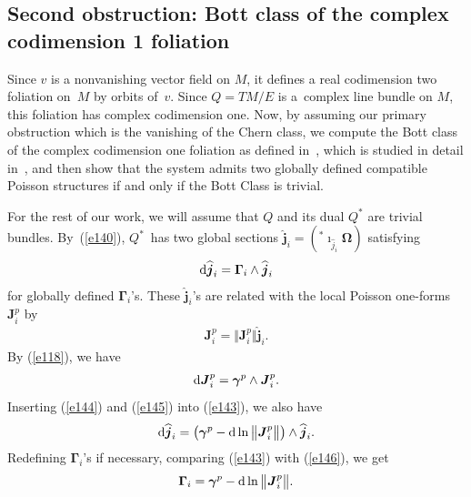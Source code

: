 \documentclass[pdftex]{sigma}
\numberwithin{equation}{section}
\begin{document}
\subsection{Second obstruction: Bott class of the complex codimension 1 foliation}\label{section3.3}

Since $v$ is a nonvanishing vector f\/ield on $M$, it def\/ines a real codimension two foliation on~$M$ by orbits of~$v$. Since $Q=TM/E$ is a~complex line bundle on $M$, this foliation has complex codimension one. Now, by assuming our primary obstruction which is the vanishing of the Chern class, we compute the Bott class of the complex codimension one foliation as def\/ined in~\cite{Bott}, which is studied in detail in~\cite{Taro}, and then show that the system admits two globally def\/ined compatible Poisson structures if and only if the Bott Class is trivial.

For the rest of our work, we will assume that $Q$ and its dual $Q^{\ast }$ are trivial bundles. By~(\ref{e140}), $Q^{\ast }$~has two global sections $\widehat{\boldsymbol{j}}_{i} = ( ^{\ast }\imath _{\widehat{j}_{i}}\boldsymbol{\Omega } )$ satisfying
\begin{gather}
{\rm d}\widehat{\boldsymbol{j}}_{i}=\boldsymbol{\Gamma }_{i}\wedge \widehat{\boldsymbol{j}}_{i}\label{e143}
\end{gather}
for globally def\/ined $\boldsymbol{\Gamma }_{i}$'s. These $\widehat{\boldsymbol{j}}_{i}$'s are related with the local Poisson one-forms $\boldsymbol{J}_{i}^{p}$ by
\begin{gather}
\boldsymbol{J}_{i}^{p}=\big\Vert \boldsymbol{J}_{i}^{p}\big\Vert \widehat{\boldsymbol{j}}_{i}. \label{e144}
\end{gather}
By (\ref{e118}), we have
\begin{gather}
{\rm d}\boldsymbol{J}_{i}^{p}=\boldsymbol{\gamma }^{p}\wedge \boldsymbol{J}_{i}^{p}.\label{e145}
\end{gather}
Inserting (\ref{e144}) and (\ref{e145}) into (\ref{e143}), we also have
\begin{gather}
{\rm d}\widehat{\boldsymbol{j}}_{i}=\big( \boldsymbol{\gamma }^{p}-{\rm d}\ln \big\Vert \boldsymbol{J}_{i}^{p}\big\Vert \big) \wedge \widehat{\boldsymbol{j}}_{i}. \label{e146}
\end{gather}
Redef\/ining $\boldsymbol{\Gamma} _{i}$'s if necessary, comparing (\ref{e143}) with (\ref{e146}), we get
\begin{gather}
\boldsymbol{\Gamma }_{i}=\boldsymbol{\gamma }^{p}-{\rm d}\ln \big\Vert \boldsymbol{J}_{i}^{p}\big\Vert. \label{e147}
\end{gather}
\end{document}
